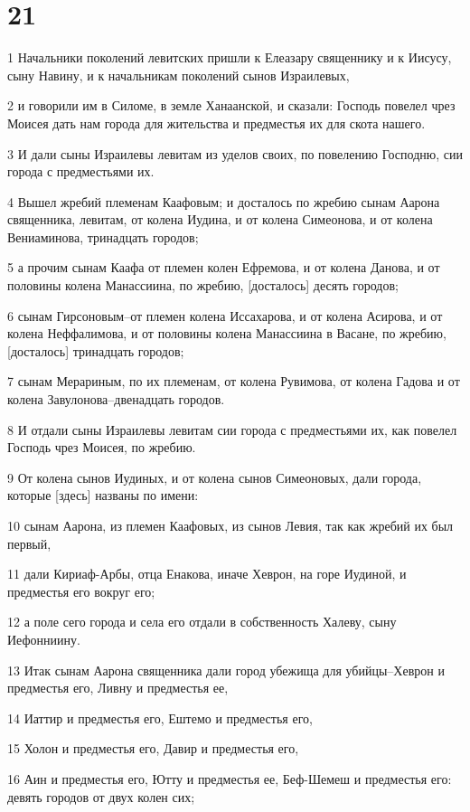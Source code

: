 \chapter{21}

\par 1 Начальники поколений левитских пришли к Елеазару священнику и к Иисусу, сыну Навину, и к начальникам поколений сынов Израилевых,
\par 2 и говорили им в Силоме, в земле Ханаанской, и сказали: Господь повелел чрез Моисея дать нам города для жительства и предместья их для скота нашего.
\par 3 И дали сыны Израилевы левитам из уделов своих, по повелению Господню, сии города с предместьями их.
\par 4 Вышел жребий племенам Каафовым; и досталось по жребию сынам Аарона священника, левитам, от колена Иудина, и от колена Симеонова, и от колена Вениаминова, тринадцать городов;
\par 5 а прочим сынам Каафа от племен колен Ефремова, и от колена Данова, и от половины колена Манассиина, по жребию, [досталось] десять городов;
\par 6 сынам Гирсоновым--от племен колена Иссахарова, и от колена Асирова, и от колена Неффалимова, и от половины колена Манассиина в Васане, по жребию, [досталось] тринадцать городов;
\par 7 сынам Мерариным, по их племенам, от колена Рувимова, от колена Гадова и от колена Завулонова--двенадцать городов.
\par 8 И отдали сыны Израилевы левитам сии города с предместьями их, как повелел Господь чрез Моисея, по жребию.
\par 9 От колена сынов Иудиных, и от колена сынов Симеоновых, дали города, которые [здесь] названы по имени:
\par 10 сынам Аарона, из племен Каафовых, из сынов Левия, так как жребий их был первый,
\par 11 дали Кириаф-Арбы, отца Енакова, иначе Хеврон, на горе Иудиной, и предместья его вокруг его;
\par 12 а поле сего города и села его отдали в собственность Халеву, сыну Иефонниину.
\par 13 Итак сынам Аарона священника дали город убежища для убийцы--Хеврон и предместья его, Ливну и предместья ее,
\par 14 Иаттир и предместья его, Ештемо и предместья его,
\par 15 Холон и предместья его, Давир и предместья его,
\par 16 Аин и предместья его, Ютту и предместья ее, Беф-Шемеш и предместья его: девять городов от двух колен сих;
